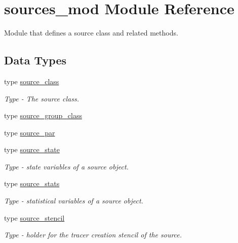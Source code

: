 \hypertarget{namespacesources__mod}{}\section{sources\+\_\+mod Module Reference}
\label{namespacesources__mod}


Module that defines a source class and related methods.  


\subsection*{Data Types}
\begin{DoxyCompactItemize}
\item 
type \mbox{\hyperlink{structsources__mod_1_1source__class}{source\+\_\+class}}
\begin{DoxyCompactList}\small\item\em Type -\/ The source class. \end{DoxyCompactList}\item 
type \mbox{\hyperlink{structsources__mod_1_1source__group__class}{source\+\_\+group\+\_\+class}}
\item 
type \mbox{\hyperlink{structsources__mod_1_1source__par}{source\+\_\+par}}
\item 
type \mbox{\hyperlink{structsources__mod_1_1source__state}{source\+\_\+state}}
\begin{DoxyCompactList}\small\item\em Type -\/ state variables of a source object. \end{DoxyCompactList}\item 
type \mbox{\hyperlink{structsources__mod_1_1source__stats}{source\+\_\+stats}}
\begin{DoxyCompactList}\small\item\em Type -\/ statistical variables of a source object. \end{DoxyCompactList}\item 
type \mbox{\hyperlink{structsources__mod_1_1source__stencil}{source\+\_\+stencil}}
\begin{DoxyCompactList}\small\item\em Type -\/ holder for the tracer creation stencil of the source. \end{DoxyCompactList}\end{DoxyCompactItemize}
